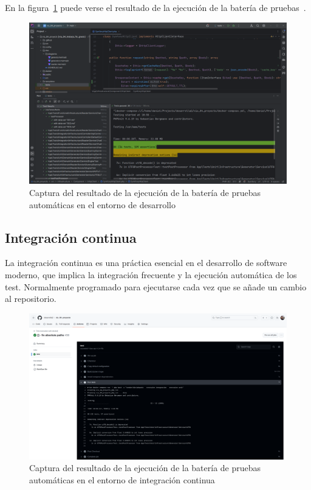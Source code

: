 En la figura~\ref{fig:chapter_4.5.test_suite_execution} puede verse el resultado de la ejecución de la batería de
pruebas~\cite{url_viu_84_proyecto_continous_integration}.

\begin{figure}[ht]
    \begin{center}
        \includegraphics[width=\textwidth]{./chapter/4/images/chapter_4.5.test_suite_execution}
        \caption{Captura del resultado de la ejecución de la batería de pruebas automáticas en el entorno de desarrollo}
        \label{fig:chapter_4.5.test_suite_execution}
    \end{center}
\end{figure}

\subsection*{Integración continua}

La integración continua es una práctica esencial en el desarrollo de software moderno, que implica la integración
frecuente y la ejecución automática de los test.
Normalmente programado para ejecutarse cada vez que se añade un cambio al repositorio.

\begin{figure}[ht]
    \begin{center}
        \includegraphics[width=\textwidth]{./chapter/4/images/chapter_4.5.github_actions_execution}
        \caption{Captura del resultado de la ejecución de la batería de pruebas automáticas en el entorno de integración
        continua}
        \label{fig:chapter_4.5.github_actions_execution}
    \end{center}
\end{figure}

